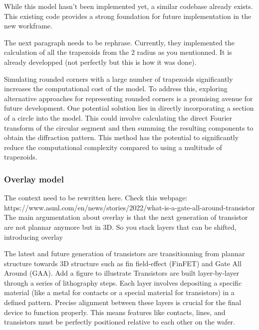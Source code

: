 \medskip

While this model hasn't been implemented yet, a similar codebase already exists. This existing
code provides a strong foundation for future implementation in the new workframe.

\medskip

\color{red} The next paragraph needs to be rephrase. Currently, they implemented the calculation of all the trapezoids from 
the 2 radius as you mentionned. It is already developped (not perfectly but this is how it was done).\color{black} 

Simulating rounded corners with a large number of trapezoids significantly increases the 
computational cost of the model. To address this, exploring alternative approaches for representing 
rounded corners is a promising avenue for future development. One potential solution lies in 
directly incorporating a section of a circle into the model. This could involve calculating the 
direct Fourier transform of the circular segment and then summing the resulting components to obtain the 
diffraction pattern. This method has the potential to significantly reduce the computational 
complexity compared to using a multitude of trapezoids.

\subsubsection{Overlay model}
\color{red} The context need to be rewritten here. Check this webpage: https://www.asml.com/en/news/stories/2022/what-is-a-gate-all-around-transistor
The main argumentation about overlay is that the next generation of transistor are not plannar anymore but in 3D. So you stack layers that can be shifted, introducing overlay
\color{black} 



The latest and future generation of transistors are transitionning from plannar structure towards 3D structure such as fin field-effect (FinFET) and Gate All Around (GAA).
\color{red} Add a figure to illustrate \color{black} 
Transistors are built layer-by-layer through a series of lithography steps. 
Each layer involves depositing a specific material (like a metal for contacts or a 
special material for transistors) in a defined pattern. Precise alignment between these 
layers is crucial for the final device to function properly. This means features like 
contacts, lines, and transistors must be perfectly positioned relative to each other 
on the wafer.

\medskip

